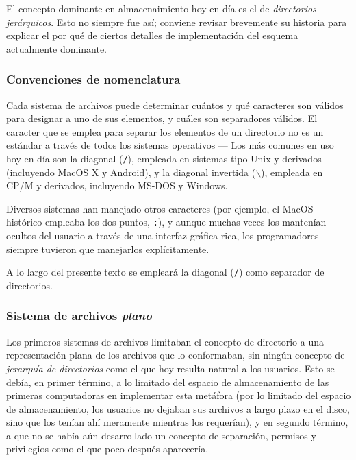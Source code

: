 \documentclass[11pt,fleqn]{book} %
\begin{document}
El concepto dominante en almacenaimiento hoy en día es el de \emph{directorios jerárquicos}. Esto no siempre fue así; conviene revisar brevemente su
historia para explicar el por qué de ciertos detalles de
implementación del esquema actualmente dominante.
\subsubsection{Convenciones de nomenclatura}
\label{sec-6-3-1-1}


Cada sistema de archivos puede determinar cuántos y qué caracteres
son válidos para designar a uno de sus elementos, y cuáles son
separadores válidos. El caracter que se emplea para separar los
elementos de un directorio no es un estándar a través de todos los
sistemas operativos — Los más comunes en uso hoy en día
son la diagonal (\texttt{/}), empleada en sistemas tipo Unix y derivados
(incluyendo MacOS X y Android), y la diagonal invertida ($\backslash$),
empleada en CP/M y derivados, incluyendo MS-DOS y Windows.

Diversos sistemas han manejado otros caracteres (por ejemplo, el MacOS
histórico empleaba los dos puntos, \texttt{:}), y aunque muchas veces los
mantenían ocultos del usuario a través de una interfaz gráfica rica,
los programadores siempre tuvieron que manejarlos explícitamente.

A lo largo del presente texto se empleará la diagonal (\texttt{/}) como
separador de directorios.
\subsubsection{Sistema de archivos \emph{plano}}
\label{sec-6-3-1-2}


Los primeros sistemas de archivos limitaban el concepto de directorio
a una representación plana de los archivos que lo conformaban, sin
ningún concepto de \emph{jerarquía de directorios} como el que hoy resulta
natural a los usuarios. Esto se debía, en primer término, a lo
limitado del espacio de almacenamiento de las primeras computadoras en
implementar esta metáfora (por lo limitado del espacio de
almacenamiento, los usuarios no dejaban sus archivos a largo plazo en
el disco, sino que los tenían ahí meramente mientras los requerían), y
en segundo término, a que no se había aún desarrollado un concepto de
separación, permisos y privilegios como el que poco después
aparecería.
\end{document}
